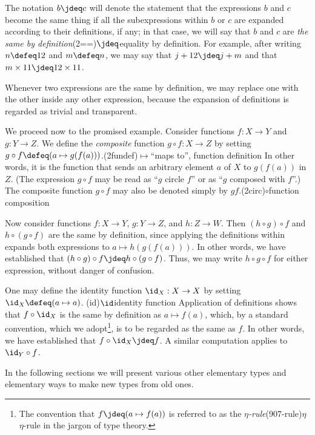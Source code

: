 The notation $b \jdeq c$ will denote the statement that the expressions $b$ and $c$ become the same thing if all the subexpressions within $b$
or $c$ are expanded according to their definitions, if any; in that case, we will say that $b$ and $c$ are \emph{the same by
definition}\glossary(2==){$\jdeq$}{equality by definition}.  For example, after writing $n \defeq 12$ and $m \defeq n$, we may say that $j + 12
\jdeq j + m$ and that $m \times 11 \jdeq 12 \times 11$.

Whenever two expressions are the same by definition, we may replace one with the other inside any other expression, because the expansion of
definitions is regarded as trivial and transparent.

We proceed now to the promised example.  Consider functions $f : X \to Y$ and $g : Y \to Z$.  We define the \emph{composite} function
$g \circ f : X \to Z$ by setting $g \circ f \defeq (a \mapsto g(f(a)))$.\glossary(2fundef){$\mapsto$}{``maps to'', function definition}
In other words, it
is the function that sends an arbitrary element $a$ of $X$ to $g(f(a))$ in $Z$.  (The expression $g \circ f$ may be read as ``$g$ circle $f$''
or as ``$g$ composed with $f$''.)  The composite function $g \circ f$ may also be denoted simply by $gf$.\glossary(2circ){$\circ$}{function composition}

Now consider functions $f : X \to Y$, $g : Y \to Z$, and $h : Z \to W$.  Then $(h \circ g) \circ f$ and $h \circ (g \circ f)$ are the same by
definition, since applying the definitions within expands both expressions to $a \mapsto h(g(f(a)))$.  In other
words, we have established that $(h \circ g) \circ f \jdeq h \circ (g \circ f)$.  Thus, we may write $h \circ g \circ f$ for
either expression, without danger of confusion.

One may define the identity function $\id_X : X \to X$ by setting
$\id_X \defeq (a \mapsto a)$.
\glossary(id){$\id$}{identity function} Application of definitions shows that
$f \circ \id_X$ is the same by definition as $a \mapsto f(a)$, which, by a standard convention, which we adopt\footnote{The convention that
  $f \jdeq (a \mapsto f(a))$ is referred to as the \emph{$\eta$-rule}\glossary(907-rule){$\eta$}{$\eta$-rule} in the jargon of type theory.}, is to be regarded as the same as $f$.  In
other words, we have established that $f \circ \id_X \jdeq f$.%
\label{page:idofetaf}
A similar computation applies to $\id_Y \circ f$.

In the following sections we will present various other elementary types and elementary ways to make new types from old ones.


